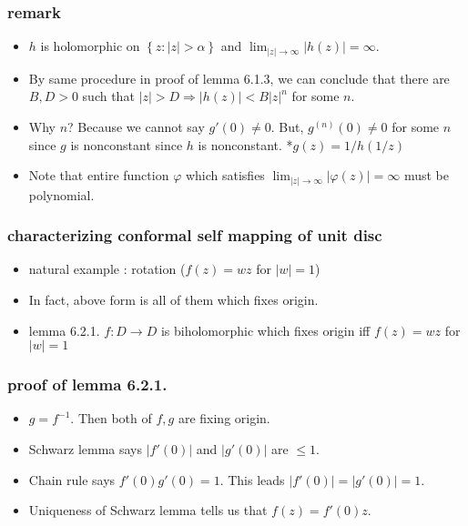 \documentclass{beamer}
\begin{document}
\begin{frame}
	\frametitle{remark}
	\begin{itemize}
		\item $h$ is holomorphic on $\left\{ z: |z| > \alpha \right\}$ and $\lim_{|z| \rightarrow \infty} |h(z)| = \infty$.
		\item By same procedure in proof of lemma 6.1.3, we can conclude that there are $B, D>0$ such that $|z| > D \Rightarrow |h(z)| < B|z|^n$ for some $n$.
		\item Why $n$? Because we cannot say $g'(0) \ne 0$. But, $g^{(n)}(0) \ne 0$ for some $n$ since $g$ is nonconstant since $h$ is nonconstant. *$g(z) = 1/h(1/z)$
		\item Note that entire function $\varphi$ which satisfies $\lim_{|z| \rightarrow \infty} |\varphi(z) | = \infty$ must be polynomial.
	\end{itemize}
\end{frame}

\begin{frame}
	\frametitle{characterizing conformal self mapping of unit disc}
	\begin{itemize}
		\item natural example : rotation ($f(z) = wz$ for $|w| = 1$)
		\item In fact, above form is all of them which fixes origin.
		\item 
			\begin{alertblock}{lemma 6.2.1.}
				$f: D \rightarrow D$ is biholomorphic which fixes origin iff $f(z) = wz$ for $|w| = 1$
				
			\end{alertblock}
	\end{itemize}
\end{frame}

\begin{frame}
	\frametitle{proof of lemma 6.2.1.}
	\begin{itemize}
		\item $g = f^{-1}$. Then both of $f, g$ are fixing origin.
		\item Schwarz lemma says $|f'(0)| $ and $|g'(0)|$ are $\leq 1$.
		\item Chain rule says $f'(0)g'(0) = 1$. This leads $|f'(0)| = |g'(0)| = 1$. 
		\item Uniqueness of Schwarz lemma tells us that $f(z) = f'(0)z$.
	\end{itemize}
\end{frame}
\end{document}
